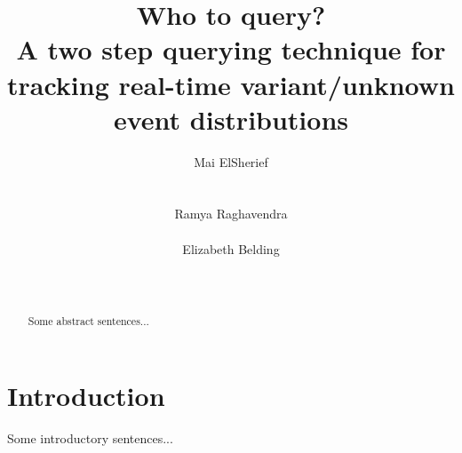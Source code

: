 \documentclass{acm_proc_article-sp}
\begin{document}
\title{Who to query? \\A two step querying technique for tracking real-time variant/unknown event distributions }

\author{
%
%
\alignauthor
Mai ElSherief\\
      \\
      \\
      \alignauthor
Ramya Raghavendra\\
      \\
\alignauthor
Elizabeth Belding\\
     \\
      \\
}

\maketitle


\begin{abstract}
Some abstract sentences...

\end{abstract}


\section{Introduction}

Some introductory sentences...
\end{document}
